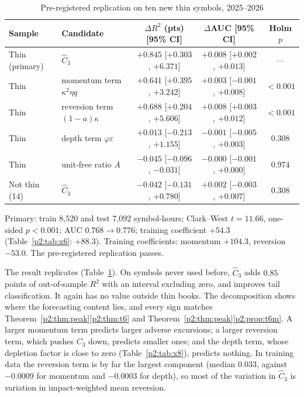 \begin{table}[t]\centering
\begin{threeparttable}
\caption{Pre-registered replication on ten new thin symbols, 2025--2026}\label{p2:tab:y6}
\small\setlength{\tabcolsep}{4pt}
\begin{tabular}{llccc}
\toprule
Sample & Candidate & $\Delta R^2$ (pts) [95\% CI] & $\Delta$AUC [95\% CI] & Holm $p$\\
\midrule
Thin (primary) & $\hat C_3$ & $+0.845$ [$+0.303$, $+6.371$] & $+0.008$ [$+0.002$, $+0.013$] & ---\\
Thin & momentum term $\kappa^2\eta q$ & $+0.641$ [$+0.395$, $+3.242$] & $+0.003$ [$-0.001$, $+0.008$] & $<0.001$\\
Thin & reversion term $(1-a)\kappa$ & $+0.688$ [$+0.204$, $+5.606$] & $+0.008$ [$+0.003$, $+0.012$] & $<0.001$\\
Thin & depth term $\varphi\varepsilon$ & $+0.013$ [$-0.213$, $+1.155$] & $-0.001$ [$-0.005$, $+0.003$] & 0.308\\
Thin & unit-free ratio $A$ & $-0.045$ [$-0.096$, $-0.031$] & $-0.000$ [$-0.001$, $+0.000$] & 0.974\\
Not thin (14) & $\hat C_3$ & $-0.042$ [$-0.131$, $+0.780$] & $+0.002$ [$-0.003$, $+0.007$] & 0.308\\
\bottomrule
\end{tabular}
\begin{tablenotes}\footnotesize\item Primary: train 8{,}520 and test 7{,}092 symbol-hours; Clark--West $t=11.66$, one-sided $p<0.001$; AUC $0.768\to0.776$; training coefficient $+54.3$ (Table~\ref{p2:tab:x6}: $+88.3$). Training coefficients: momentum $+104.3$, reversion $-53.0$. The pre-registered replication passes. \end{tablenotes}
\end{threeparttable}
\end{table}

The result replicates (Table~\ref{p2:tab:y6}). On symbols never used before, $\hat C_3$ adds $0.85$ points of out-of-sample $R^2$ with an interval excluding zero, and improves tail classification. It again has no value outside thin books. The decomposition shows where the forecasting content lies, and every sign matches Theorem~\ref{p2:thm:peak}\ref{p2:thm:t6} and Theorem~\ref{p2:thm:peak}\ref{p2:prop:t6m}. A larger momentum term predicts larger adverse excursions; a larger reversion term, which pushes $C_3$ down, predicts smaller ones; and the depth term, whose depletion factor is close to zero (Table~\ref{p2:tab:x8}), predicts nothing. In training data the reversion term is by far the largest component (median $0.033$, against $-0.0009$ for momentum and $-0.0003$ for depth), so most of the variation in $\hat C_3$ is variation in impact-weighted mean reversion.

